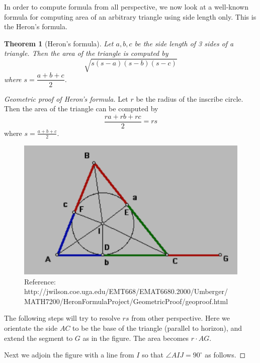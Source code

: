 \documentclass[12pt]{article}
\newtheorem*{theorem}{Theorem}
\begin{document}
    In order to compute formula from all perspective, we now look at a well-known formula for computing area of an arbitrary triangle using side length only. This is the Heron's formula.

    \begin{theorem}[Heron's formula]
        Let $a,b,c$ be the side length of 3 sides of a triangle. Then the area of the triangle is computed by $$\sqrt{s(s-a)(s-b)(s-c)}$$where $s=\dfrac{a+b+c}{2}$.
    \end{theorem}

    \begin{proof}[Geometric proof of Heron's formula]
        Let $r$ be the radius of the inscribe circle. Then the area of the triangle can be computed by $$\frac{ra+rb+rc}{2}=rs$$ where $s=\frac{a+b+c}{2}$. 

        \begin{figure}[H]
            \centering
            \includegraphics[scale=0.8]{heron.png}
            \caption{Reference: http://jwilson.coe.uga.edu/EMT668/EMAT6680.2000/Umberger/\\MATH7200/HeronFormulaProject/GeometricProof/geoproof.html}
        \end{figure}

        The following steps will try to resolve $rs$ from other perspective. Here we orientate the side $AC$ to be the base of the triangle (parallel to horizon), and extend the segment to $G$ as in the figure. The area becomes $r\cdot AG$.

        Next we adjoin the figure with a line from $I$ so that $\angle AIJ = 90^\circ$ as follows.


\end{proof}
\end{document}
